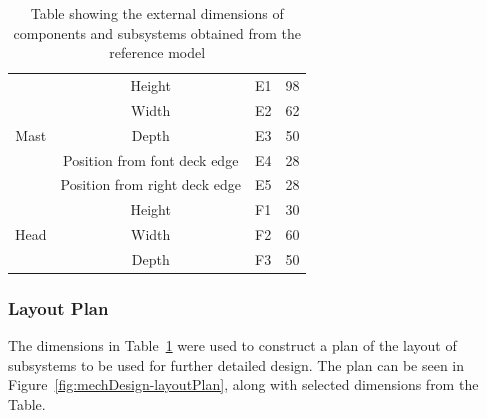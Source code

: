 \begin{table}[h!]
\begin{tabular}{@{}cccc@{}}
      \multirow{5}{*}{Mast}       & Height                        & E1   & 98    \\
                                  & Width                         & E2   & 62    \\
                                  & Depth                         & E3   & 50    \\
                                  & Position from font deck edge  & E4   & 28    \\
                                  & Position from right deck edge & E5   & 28    \\ \midrule
      \multirow{3}{*}{Head}       & Height                        & F1   & 30    \\
                                  & Width                         & F2   & 60    \\
                                  & Depth                         & F3   & 50    \\ \bottomrule
      \end{tabular}
      \caption{Table showing the external dimensions of components and subsystems obtained from the reference model \cite{nasa3Dprint}}
      \label{tab:design-referenceDimensions}
      \end{table}
      
    \subsubsection{Layout Plan}
      The dimensions in Table~\ref{tab:design-referenceDimensions} were used to construct a plan of the layout of subsystems to be used for further detailed design. The plan can be seen in Figure~\ref{fig:mechDesign-layoutPlan}, along with selected dimensions from the Table.
      
